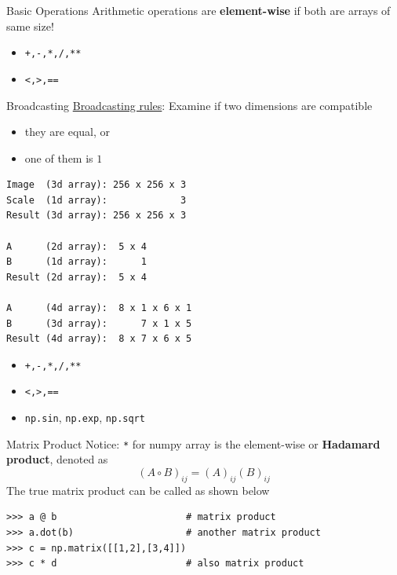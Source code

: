 \documentclass{../TexTemplate/myslide}
\begin{document}
\begin{frame}[fragile]{Basic Operations}
Arithmetic operations are \textbf{element-wise} if both are arrays of same size!
\begin{itemize}
	\item \verb'+,-,*,/,**'
	\item \verb'<,>,=='
\end{itemize}
\end{frame}

\begin{frame}[fragile]{Broadcasting}
\href{https://docs.scipy.org/doc/numpy/user/basics.broadcasting.html}{Broadcasting rules}: Examine if two dimensions are compatible
\begin{itemize}
	\item they are equal, or
	\item one of them is $1$
\end{itemize}
\begin{lstlisting}
Image  (3d array): 256 x 256 x 3
Scale  (1d array):             3
Result (3d array): 256 x 256 x 3

A      (2d array):  5 x 4
B      (1d array):      1
Result (2d array):  5 x 4

A      (4d array):  8 x 1 x 6 x 1
B      (3d array):      7 x 1 x 5
Result (4d array):  8 x 7 x 6 x 5
\end{lstlisting}
\begin{itemize}
	\item \verb'+,-,*,/,**'
	\item \verb'<,>,=='
	\item \verb'np.sin', \verb'np.exp', \verb'np.sqrt'
\end{itemize}
\end{frame}

\begin{frame}[fragile]{Matrix Product}
Notice: \verb'*' for numpy array is the element-wise or \textbf{Hadamard product}, denoted as
\[(A\circ B)_{ij}=(A)_{ij}(B)_{ij}\]
The true matrix product can be called as shown below
\begin{lstlisting}
>>> a @ b                       # matrix product
>>> a.dot(b)                    # another matrix product
>>> c = np.matrix([[1,2],[3,4]])
>>> c * d                       # also matrix product
\end{lstlisting}
\end{frame}
\end{document}
